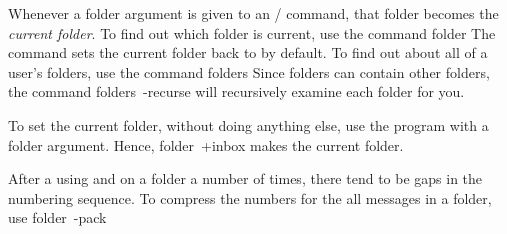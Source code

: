 Whenever a folder argument is given to an \MH/ command,
that folder becomes the {\it current folder}.
To find out which folder is current, use the command
\example folder\endexample
The  command sets the current folder back to 
by default.
To find out about all of a user's folders, use the command
\example folders\endexample
Since folders can contain other folders,
the command
\example folders\ -recurse\endexample
will recursively examine each folder for you.

To set the current folder, without doing anything else,
use the  program with a folder argument.
Hence,
\example folder\ +inbox\endexample
makes  the current folder.

After a using  and  on a folder a number of times,
there tend to be gaps in the numbering sequence.
To compress the numbers for the all messages in a folder,
use
\example folder\ -pack\endexample

